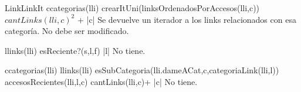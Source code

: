 \begin{interfaz}{LinkLinkIt}
{c\in categorias(lli)}
{\igres crearItUni(linksOrdenadosPorAccesos(lli,c))}
{$cantLinks(lli,c)^2$ + |c|}
{Se devuelve un iterador a los links relacionados con esa categoría. No debe ser modificado.}

{l\in links(lli)}
{\igres esReciente?(s,l,f)}
{|l|}
{No tiene.}

{c\in categorias(lli) \land l\in links(lli) \land esSubCategoria(lli.dameACat,c,categoriaLink(lli,l))}
{\igres accesosRecientes(lli,l,c)}
{cantLinks(lli,c)+ |c|}
{No tiene.}






\end{interfaz}
